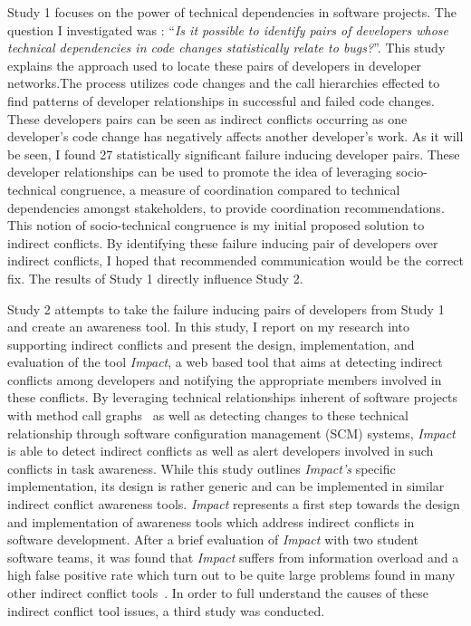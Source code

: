 Study 1 focuses on the power of technical dependencies in software projects. The question I
investigated was : ``\textit{Is it possible to identify pairs of developers whose technical dependencies in 
code changes statistically relate to bugs?}''. This study explains the approach used to locate these pairs of developers 
in developer networks.The process utilizes code changes and the call hierarchies effected to find patterns of developer 
relationships in successful and failed code changes. These developers pairs can be seen as indirect conflicts occurring
as one developer's code change has negatively affects another developer's work. As it will be seen, I found 27 statistically significant failure 
inducing developer pairs. These developer relationships can be used to promote the idea of leveraging socio-technical 
congruence, a measure of coordination compared to technical dependencies amongst stakeholders, to provide coordination recommendations.
This notion of socio-technical congruence is my initial proposed solution to indirect conflicts. By identifying these failure
inducing pair of developers over indirect conflicts, I hoped that recommended communication would be the correct fix. The 
results of Study 1 directly influence Study 2.

Study 2 attempts to take the failure inducing pairs of developers from Study 1 and create an awareness tool.
In this study, I report on my research into supporting indirect conflicts and present the design, implementation, and 
evaluation of the tool \textit{Impact}, a web based tool that aims at detecting indirect conflicts among developers and 
notifying the appropriate members involved in these conflicts. By leveraging technical relationships inherent of software 
projects with method call graphs~\cite{Lakhotia:1993:CCM} as well as detecting changes to these technical relationship 
through software configuration management (SCM) systems, \textit{Impact} is able to detect indirect conflicts as well as 
alert developers involved in such conflicts in task awareness. While this study outlines \textit{Impact's} specific 
implementation, its design is rather generic and can be implemented in similar indirect conflict awareness tools. 
\textit{Impact} represents a first step towards the design and implementation of awareness tools which address indirect 
conflicts in software development. After a brief evaluation of \textit{Impact} with two student software teams, it was
found that \textit{Impact} suffers from information overload and a high false positive rate which turn out to be quite
large problems found in many other indirect conflict
tools~\cite{Sarma:2007:TSA, Holmes:2010:CAR, Trainer:2005:BGT, Servant:2010:CPI, Borici:2012:CHA}. In order to full understand 
the causes of these indirect conflict tool issues, a third study was conducted.


